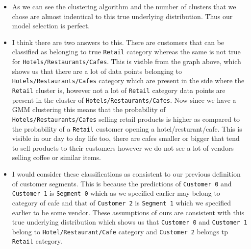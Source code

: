 \documentclass[11pt]{article}
\providecommand{\tightlist}{%
      \setlength{\itemsep}{0pt}\setlength{\parskip}{0pt}}
\begin{document}
\begin{itemize}
\tightlist
\item
  As we can see the clustering algorithm and the number of clusters that
  we chose are almost indentical to this true underlying distribution.
  Thus our model selection is perfect.
\item
  I think there are two answers to this. There are customers that can be
  classified as belonging to true \texttt{Retail} category whereas the
  same is not true for \texttt{Hotels/Restaurants/Cafes}. This is
  visible from the graph above, which shows us that there are a lot of
  data points belonging to \texttt{Hotels/Restaurants/Cafes} category
  which are present in the side where the \texttt{Retail} cluster is,
  however not a lot of \texttt{Retail} category data points are present
  in the cluster of \texttt{Hotels/Restaurants/Cafes}. Now since we have
  a GMM clustering this means that the probability of
  \texttt{Hotels/Restaurants/Cafes} selling retail products is higher as
  compared to the probability of a \texttt{Retail} customer opening a
  hotel/resturant/cafe. This is visible in our day to day life too,
  there are cafes smaller or bigger that tend to sell products to their
  customers however we do not see a lot of vendors selling coffee or
  similar items.
\item
  I would consider these classifications as consistent to our previous
  definition of customer segments. This is because the predictions of
  \texttt{Customer\ 0} and \texttt{Customer\ 1} is \texttt{Segment\ 0}
  which as we specified earlier may belong to category of cafe and that
  of \texttt{Customer\ 2} is \texttt{Segment\ 1} which we specified
  earlier to be some vendor. These assumptions of ours are consistent
  with this true underlying distribution which shows us that
  \texttt{Customer\ 0} and \texttt{Customer\ 1} belong to
  \texttt{Hotel/Restaurant/Cafe} category and \texttt{Customer\ 2}
  belongs tp \texttt{Retail} category.
\end{itemize}


    
    
    
    
\end{document}
